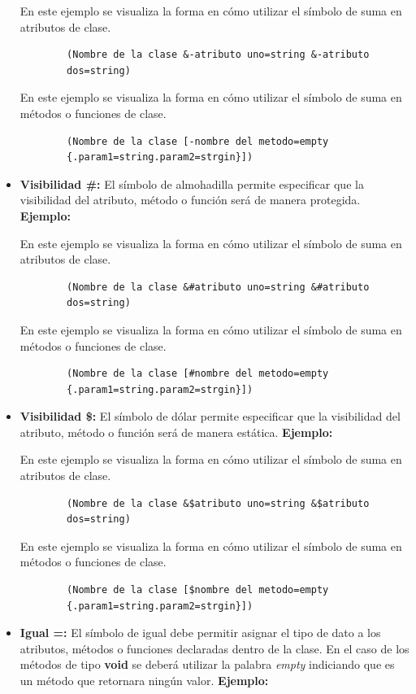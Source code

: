 \begin{itemize}
	En este ejemplo se visualiza la forma en cómo utilizar el símbolo de suma en atributos de clase.
	
	\begin{verbatim}
		(Nombre de la clase &-atributo uno=string &-atributo 
		dos=string)
	\end{verbatim}
	
	En este ejemplo se visualiza la forma en cómo utilizar el símbolo de suma en métodos o funciones de clase.
	
	\begin{verbatim}
		(Nombre de la clase [-nombre del metodo=empty
		{.param1=string.param2=strgin}])
	\end{verbatim}
	
	\item \textbf{Visibilidad \#: } El símbolo de almohadilla permite especificar que la visibilidad del atributo, método o función será de manera protegida. \textbf{Ejemplo:}
	
	En este ejemplo se visualiza la forma en cómo utilizar el símbolo de suma en atributos de clase.
	
	\begin{verbatim}
		(Nombre de la clase &#atributo uno=string &#atributo 
		dos=string)
	\end{verbatim}
	
	En este ejemplo se visualiza la forma en cómo utilizar el símbolo de suma en métodos o funciones de clase.
	
	\begin{verbatim}
		(Nombre de la clase [#nombre del metodo=empty
		{.param1=string.param2=strgin}])
	\end{verbatim}
	
	\item \textbf{Visibilidad \$: } El símbolo de dólar permite especificar que la visibilidad del atributo, método o función será de manera estática. \textbf{Ejemplo:}
	
	En este ejemplo se visualiza la forma en cómo utilizar el símbolo de suma en atributos de clase.
	
	\begin{verbatim}
		(Nombre de la clase &$atributo uno=string &$atributo 
		dos=string)
	\end{verbatim}
	
	En este ejemplo se visualiza la forma en cómo utilizar el símbolo de suma en métodos o funciones de clase.
	
	\begin{verbatim}
		(Nombre de la clase [$nombre del metodo=empty
		{.param1=string.param2=strgin}])
	\end{verbatim}
	
	\item \textbf{Igual =:} El símbolo de igual debe permitir asignar el tipo de dato a los atributos, métodos o funciones declaradas dentro de la clase. En el caso de los métodos de tipo \textbf{void}  se deberá utilizar la palabra \textit{empty} indiciando que es un método que retornara ningún valor. \textbf{Ejemplo:}
	  
\end{itemize}

